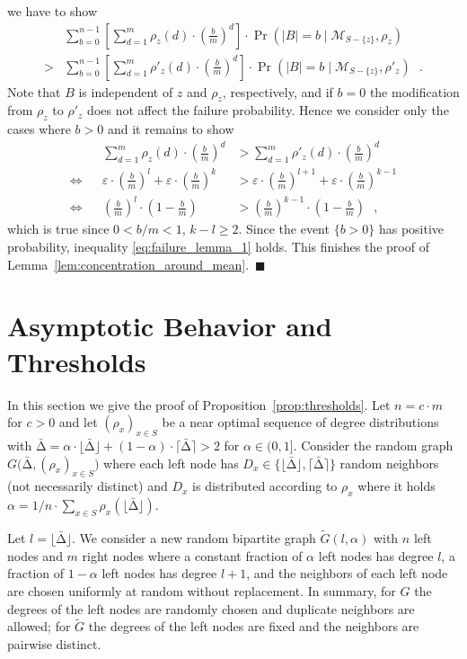 \let\accentvec\vec \documentclass{llncs}
\newcommand{\proofEnd}{{\hfill\ensuremath{\blacksquare}}}
\newcommand{\randv}{\ensuremath{D}}
\newcommand{\keys}{\ensuremath{n}}
\newcommand{\cells}{\ensuremath{m}}
\newcommand{\pmf}{\ensuremath{{\rho}}}
\newcommand{\mean}{{\mathrm{\scriptstyle\Delta}}}
\newcommand{\Amean}{\bar{\mean}}
\newcommand{\floor}[1]{\ensuremath{\lfloor #1\rfloor}}
\newcommand{\ceil}[1]{\ensuremath{\lceil #1\rceil}}
\newcommand{\eps}{\ensuremath{\varepsilon}}
\newcommand{\blank}{\text{ }}
\newcommand{\graph}{\ensuremath{G}}
\newcommand{\graphWR}{\ensuremath{\tilde{G}}}
\newcommand{\low}{\ensuremath{l}}
\newcommand{\high}{\ensuremath{k}}
\newcommand{\abs}[1]{\lvert#1\rvert}
\newcommand{\bfrac}[2]{ \left(\frac{#1}{#2}\right) }
\newcommand{\evM}{{\mathcal{M}}}
\begin{document}
we have to show
\begin{align*}
  &\sum_{b=0}^{\keys-1}\left[\sum_{d=1}^\cells \pmf_z(d)\cdot \bfrac{b}{\cells}^d \right] \cdot \Pr\left(\abs{B}=b \mid \evM_{S-\{z\}}, \pmf_z \right)\\
> &\sum_{b=0}^{\keys-1}\left[\sum_{d=1}^\cells \pmf'_z(d)\cdot \bfrac{b}{\cells}^d\right]\cdot \Pr\left(\abs{B}=b \mid \evM_{S-\{z\}}, \pmf'_z \right) \blank.
\end{align*}
Note that $B$ is independent of $z$ and $\pmf_z$, respectively, and if $b=0$ the modification from $\pmf_z$ to $\pmf'_z$ does not affect the failure probability.
Hence we consider only the cases where $b>0$ and it remains to show
\begin{align*}
 & &\sum_{d=1}^\cells \pmf_z(d)\cdot \bfrac{b}{\cells}^d 
&> \sum_{d=1}^\cells \pmf'_z(d)\cdot \bfrac{b}{\cells}^d\\
\Leftrightarrow & &
\eps \cdot \bfrac{b}{\cells}^\low+\eps \cdot \bfrac{b}{\cells}^\high &> \eps \cdot \bfrac{b}{\cells}^{\low+1}+\eps \cdot \bfrac{b}{\cells}^{\high-1 }\\
\Leftrightarrow& &
\bfrac{b}{\cells}^{\low}\cdot\left(1-\frac{b}{\cells}\right)  &> \bfrac{b}{\cells}^{\high-1}\cdot\left(1-\frac{b}{\cells}\right) \blank, 
\end{align*}
which is true since $0<b/\cells<1$, $\high-\low \geq 2$. Since the event $\{b>0\}$ has positive probability,
inequality \eqref{eq:failure_lemma_1} holds. This finishes the proof of Lemma~\ref{lem:concentration_around_mean}.~\proofEnd


\section{Asymptotic Behavior and Thresholds}
\label{app:proposition}
In this section we give the proof of Proposition~\ref{prop:thresholds}.
Let $n=c\cdot m$ for $c>0$ and let $({\pmf}_x)_{x\in S}$ be a near optimal sequence of degree distributions with
$\Amean=\alpha\cdot\floor{\Amean} +(1-\alpha)\cdot \ceil{\Amean}>2$ for  $\alpha\in(0,1]$.
Consider the random graph $\graph\big( \Amean, ({\pmf}_x)_{x\in S} \big)$
where each left node has $\randv_x\in \{\floor{\Amean},\ceil{\Amean}\}$ random neighbors
(not necessarily distinct) and $\randv_x$ is distributed according to $\pmf_x$
where it holds $\alpha=1/{\keys}\cdot \sum_{x\in S}\pmf_x(\floor{\Amean})$.

Let $\low=\floor{\Amean}$. We consider a new random bipartite graph $\graphWR(\low,\alpha)$ 
with $\keys$ left nodes and $\cells$ right nodes where 
a constant fraction of $\alpha$ left nodes has 
degree $\low$, a fraction of $1-\alpha$ left nodes has degree $\low+1$,
and the neighbors of each left node are chosen uniformly at random without replacement.
In summary, for $\graph$ the degrees of the left nodes are randomly chosen and
duplicate neighbors are allowed; for $\graphWR$ the degrees of the left nodes are fixed and
the neighbors are pairwise distinct.
\end{document}
